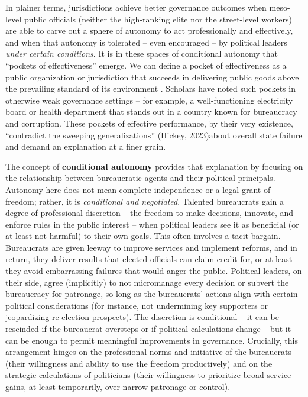In plainer terms, jurisdictions achieve better governance outcomes when meso-level public officials (neither the high-ranking elite nor the street-level workers) are able to carve out a sphere of autonomy to act professionally and effectively, and when that autonomy is tolerated – even encouraged – by political leaders \textit{under certain conditions}. It is in these spaces of conditional autonomy that “pockets of effectiveness” emerge. We can define a pocket of effectiveness as a public organization or jurisdiction that succeeds in delivering public goods above the prevailing standard of its environment \citep{hicken_building_2009}. Scholars have noted such pockets in otherwise weak governance settings – for example, a well-functioning electricity board or health department that stands out in a country known for bureaucracy and corruption. These pockets of effective performance, by their very existence, “contradict the sweeping generalizations” (Hickey, 2023)about overall state failure and demand an explanation at a finer grain.

The concept of \textbf{conditional autonomy} provides that explanation by focusing on the relationship between bureaucratic agents and their political principals. Autonomy here does not mean complete independence or a legal grant of freedom; rather, it is \textit{conditional and negotiated}. Talented bureaucrats gain a degree of professional discretion – the freedom to make decisions, innovate, and enforce rules in the public interest – when political leaders see it as beneficial (or at least not harmful) to their own goals. This often involves a tacit bargain. Bureaucrats are given leeway to improve services and implement reforms, and in return, they deliver results that elected officials can claim credit for, or at least they avoid embarrassing failures that would anger the public. Political leaders, on their side, agree (implicitly) to not micromanage every decision or subvert the bureaucracy for patronage, so long as the bureaucrats’ actions align with certain political considerations (for instance, not undermining key supporters or jeopardizing re-election prospects). The discretion is conditional – it can be rescinded if the bureaucrat oversteps or if political calculations change – but it can be enough to permit meaningful improvements in governance. Crucially, this arrangement hinges on the professional norms and initiative of the bureaucrats (their willingness and ability to use the freedom productively) and on the strategic calculations of politicians (their willingness to prioritize broad service gains, at least temporarily, over narrow patronage or control).

